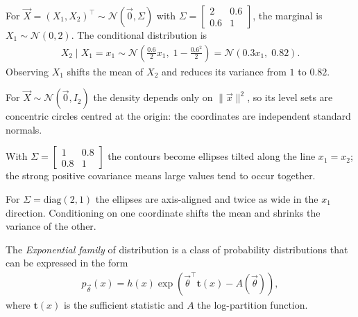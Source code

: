 \documentclass[a4paper, 12pt]{book}
\begin{document}
\begin{example}
    For $\vec X=(X_1,X_2)^\top\sim\mathscr{N}(\vec 0,\Sigma)$ with $\Sigma=\begin{bmatrix}2&0.6\\0.6&1\end{bmatrix}$, the marginal is $X_1\sim\mathscr{N}(0,2)$. The conditional distribution is
    \begin{align}
        X_2\mid X_1=x_1 \sim \mathscr{N}\!\left(\frac{0.6}{2}x_1,\;1-\frac{0.6^2}{2}\right)
        = \mathscr{N}(0.3x_1,\;0.82).
    \end{align}
    Observing $X_1$ shifts the mean of $X_2$ and reduces its variance from $1$ to $0.82$.
\end{example}

\begin{example}
    For $\vec X\sim\mathscr{N}(\vec 0,I_2)$ the density depends only on $\|\vec x\|^2$, so its level sets are concentric circles centred at the origin: the coordinates are independent standard normals.
\end{example}

\begin{example}
    With $\Sigma=\begin{bmatrix}1&0.8\\0.8&1\end{bmatrix}$ the contours become ellipses tilted along the line $x_1=x_2$; the strong positive covariance means large values tend to occur together.
\end{example}

\begin{example}
    For $\Sigma=\mathrm{diag}(2,1)$ the ellipses are axis-aligned and twice as wide in the $x_1$ direction. Conditioning on one coordinate shifts the mean and shrinks the variance of the other.
\end{example}


\begin{definition}
    The \emph{Exponential family} of distribution is a class of probability distributions that can be expressed in the form
    \begin{align}
        p_{\vec{\theta}}(x) = h(x)\exp\!\left(\vec{\theta}^\top \mathbf{t}(x) - A(\vec{\theta})\right),
    \end{align}
    where $\mathbf{t}(x)$ is the sufficient statistic and $A$ the log-partition function.
\end{definition}
\end{document}

